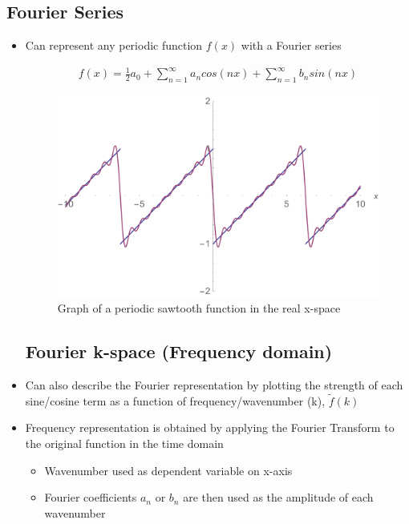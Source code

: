 \documentclass[a4paper,12pt]{article}
\begin{document}
\subsection{Fourier Series}
\begin{itemize}
  \item Can represent any periodic function $f(x)$ with a Fourier series

  \begin{align}
    f(x) = \frac{1}{2}a_0 + \sum^{\infty}_{n=1} a_n cos(nx) + \sum^{\infty}_{n=1} b_n sin(nx)
  \end{align}


  \begin{figure}[H]
    \centering
    \includegraphics[width=140mm, scale=0.5]{images/sawtooth.pdf}
    \caption{Graph of a periodic sawtooth function in the real x-space}
    \label{Basic-Sawtooth}
  \end{figure}


\subsection{Fourier k-space (Frequency domain)}

  \item Can also describe the Fourier representation by plotting the strength of each sine/cosine term as a function of frequency/wavenumber (k), $\widetilde{f}(k)$
  \item Frequency representation is obtained by applying the Fourier Transform to the original function in the time domain

  \begin{itemize}
    \item Wavenumber used as dependent variable on x-axis
    \item Fourier coefficients $a_n$ or $b_n$ are then used as the amplitude of each wavenumber
  \end{itemize}
\end{itemize}
\end{document}
